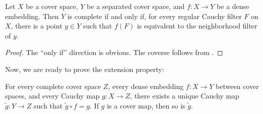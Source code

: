 \documentclass[reqno]{amsart}
\theoremstyle{definition}
\theoremstyle{remark}
\numberwithin{figure}{section}
\begin{document}
\begin{lem}
Let $X$ be a cover space, $Y$ be a separated cover space, and $f : X \to Y$ be a dense embedding.
Then $Y$ is complete if and only if, for every regular Cauchy filter $F$ on $X$, there is a point $y \in Y$ such that $f(F)$ is equivalent to the neighborhood filter of $y$.
\end{lem}
\begin{proof}
The ``only if'' direction is obvious.
The coverse follows from .
\end{proof}

Now, we are ready to prove the extension property:

\begin{thm}
For every complete cover space $Z$, every dense embedding $f : X \to Y$ between cover spaces, and every Cauchy map $g : X \to Z$,
there exists a unique Cauchy map $\widetilde{g} : Y \to Z$ such that $\widetilde{g} \circ f = g$.
If $g$ is a cover map, then so is $\widetilde{g}$.
\end{thm}
\end{document}
